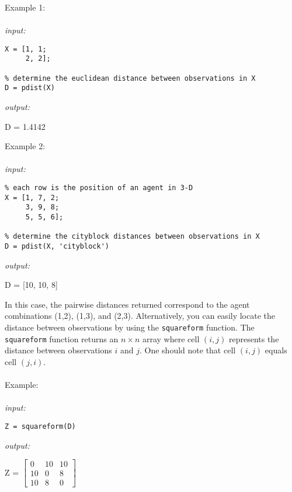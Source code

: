 \documentclass[../MATLAB_Primer.tex]{subfiles}
\begin{document}
Example 1:
\\ \\
\textit{input:}
\begin{lstlisting}[frame=single]
% consider the matrix X which has two observations: (1,1) and (2,2)
X = [1, 1; 
     2, 2]; 
     
% determine the euclidean distance between observations in X
D = pdist(X) 
\end{lstlisting}

\textit{output:}

\begin{center}
    D = 1.4142
\end{center}

Example 2:
\\ \\
\textit{input:}
\begin{lstlisting}[frame=single]
% consider the matrix X which has three observations
% each row is the position of an agent in 3-D
X = [1, 7, 2; 
     3, 9, 8; 
     5, 5, 6]; 
     
% determine the cityblock distances between observations in X
D = pdist(X, 'cityblock') 
\end{lstlisting}

\textit{output:}

\begin{center}
    D = [10, 10, 8]
\end{center}

In this case, the pairwise distances returned correspond to the agent combinations (1,2), (1,3), and (2,3).  Alternatively, you can easily locate the distance between observations by using the \texttt{squareform} function. The \texttt{squareform} function returns an $n\times n$ array where cell $(i,j)$ represents the distance between observations $i$ and $j$.  One should note that cell $(i,j)$ equals cell $(j,i)$. 
\\ \\
Example:
\\ \\
\textit{input:}
\begin{lstlisting}[frame=single]
% alternate format of distance array
Z = squareform(D)
\end{lstlisting}

\textit{output:}

\begin{center}
    Z = 
    $\begin{bmatrix}
    0 & 10 & 10\\ 
    10 & 0 & 8\\
    10 & 8 & 0
    \end{bmatrix}$
\end{center}
\end{document}
